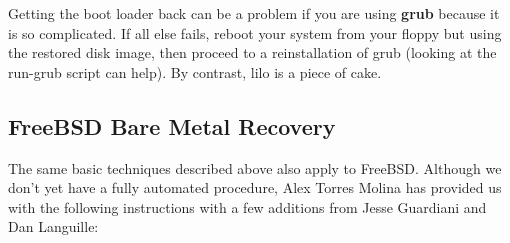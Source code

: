 Getting the boot loader back can be a problem if you are using {\bf grub}
because it is so complicated. If all else fails, reboot your system from your
floppy but using the restored disk image, then proceed to a reinstallation of
grub (looking at the run-grub script can help). By contrast, lilo is a piece
of cake. 
\label{FreeBSD1}

\subsection*{FreeBSD Bare Metal Recovery}

The same basic techniques described above also apply to FreeBSD. Although we
don't yet have a fully automated procedure, Alex Torres Molina has provided us
with the following instructions with a few additions from Jesse Guardiani and
Dan Languille: 

